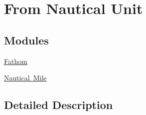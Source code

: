 \hypertarget{group___e_g_x_math-_conversions-_length_conversions-_nautical}{}\section{From Nautical Unit}
\label{group___e_g_x_math-_conversions-_length_conversions-_nautical}
\subsection*{Modules}
\begin{DoxyCompactItemize}
\item 
\mbox{\hyperlink{group___e_g_x_math-_conversions-_length_conversions-_nautical-_fathom}{Fathom}}
\item 
\mbox{\hyperlink{group___e_g_x_math-_conversions-_length_conversions-_nautical-_nautical_mile}{Nautical Mile}}
\end{DoxyCompactItemize}


\subsection{Detailed Description}
